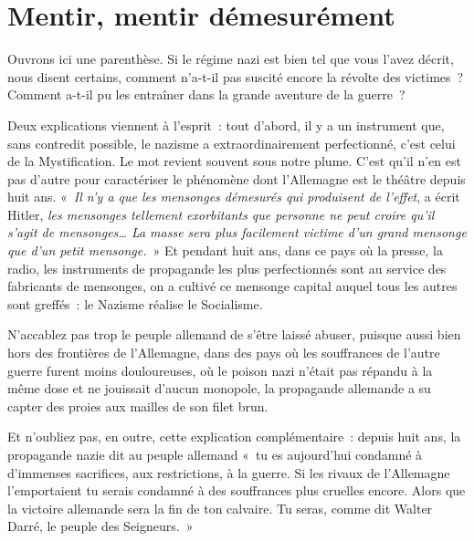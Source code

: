 \documentclass[french,twoside]{book} %
\begin{document}
\section[{Mentir, mentir démesurément}]{Mentir, mentir démesurément}
\noindent Ouvrons ici une parenthèse. Si le régime nazi est bien tel que vous l’avez décrit, nous disent certains, comment n’a-t-il pas suscité encore la révolte des victimes ? Comment a-t-il pu les entraîner dans la grande aventure de la guerre ?\par
Deux explications viennent à l’esprit : tout d’abord, il y a un instrument que, sans contredit possible, le nazisme a extraordinairement perfectionné, c’est celui de la Mystification. Le mot revient souvent sous notre plume. C’est qu’il n’en est pas d’autre pour caractériser le phénomène dont l’Allemagne est le théâtre depuis huit ans. « \emph{Il n’y a que les mensonges démesurés qui produisent de l’effet}, a écrit Hitler, \emph{les mensonges tellement exorbitants que personne ne peut croire qu’il s’agit de mensonges… La masse sera plus facilement victime d’un grand mensonge que d’un petit mensonge.} » Et pendant huit ans, dans ce pays où la presse, la radio, les instruments de propagande les plus perfectionnés sont au service des fabricants de mensonges, on a cultivé ce mensonge capital auquel tous les autres sont greffés : le Nazisme réalise le Socialisme.\par
N’accablez pas trop le peuple allemand de s’être laissé abuser, puisque aussi bien hors des frontières de l’Allemagne, dans des pays où les souffrances de l’autre guerre furent moins douloureuses, où le poison nazi n’était pas répandu à la même dose et ne jouissait d’aucun monopole, la propagande allemande a su capter des proies aux mailles de son filet brun.\par
Et n’oubliez pas, en outre, cette explication complémentaire : depuis huit ans, la propagande nazie dit au peuple allemand « tu es aujourd’hui condamné à d’immenses sacrifices, aux restrictions, à la guerre. Si les rivaux de l’Allemagne l’emportaient tu serais condamné à des souffrances plus cruelles encore. Alors que la victoire allemande sera la fin de ton calvaire. Tu seras, comme dit Walter Darré, le peuple des Seigneurs. »
\end{document}
